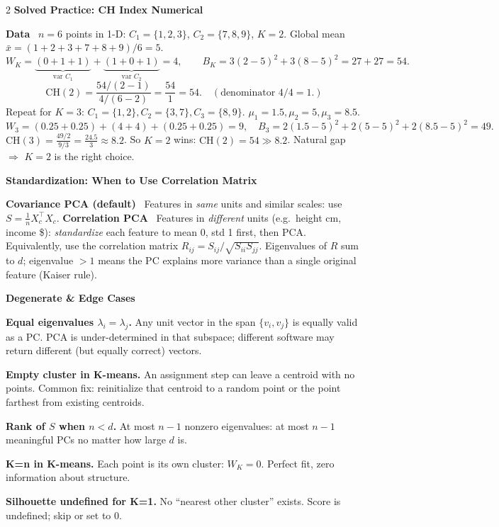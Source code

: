 \documentclass[10pt,fleqn]{article}
\newcommand{\shead}[1]{\vspace{0.1ex}\textbf{\scriptsize #1}\par}
\newcommand{\topic}[1]{\textbf{#1}\ }
\newcommand{\qa}[2]{\textbf{#1} #2\par}
\begin{document}
\begin{multicols*}{2}
\shead{Solved Practice: CH Index Numerical}
\topic{Data} \(n=6\) points in 1-D: \(C_1=\{1,2,3\}\), \(C_2=\{7,8,9\}\), \(K=2\). Global mean \(\bar x=(1+2+3+7+8+9)/6=5\).
\[
W_K=\underbrace{(0+1+1)}_{\text{var }C_1}+\underbrace{(1+0+1)}_{\text{var }C_2}=4,\qquad
B_K=3(2-5)^2+3(8-5)^2=27+27=54.
\]
\[
\mathrm{CH}(2)=\frac{54/(2-1)}{4/(6-2)}=\frac{54}{1}=54.\quad (\text{denominator }4/4=1.)
\]
Repeat for \(K=3\): \(C_1=\{1,2\},C_2=\{3,7\},C_3=\{8,9\}\). \(\mu_1=1.5,\mu_2=5,\mu_3=8.5\).
\[
W_3=(0.25+0.25)+(4+4)+(0.25+0.25)=9,\quad B_3=2(1.5-5)^2+2(5-5)^2+2(8.5-5)^2=49.
\]
\(\mathrm{CH}(3)=\frac{49/2}{9/3}=\frac{24.5}{3}\approx 8.2\). So \(K=2\) wins: \(\boxed{\mathrm{CH}(2)=54\gg 8.2}\). Natural gap \(\Rightarrow\) \(K=2\) is the right choice.

\shead{Standardization: When to Use Correlation Matrix}
\topic{Covariance PCA (default)} Features in \emph{same} units and similar scales: use \(S=\frac1n X_c^\top X_c\).
\topic{Correlation PCA} Features in \emph{different} units (e.g.\ height cm, income \$): \emph{standardize} each feature to mean 0, std 1 first, then PCA. Equivalently, use the correlation matrix \(R_{ij}=S_{ij}/\sqrt{S_{ii}S_{jj}}\). Eigenvalues of \(R\) sum to \(d\); eigenvalue \(>1\) means the PC explains more variance than a single original feature (Kaiser rule).

\shead{Degenerate \& Edge Cases}
\qa{Equal eigenvalues \(\lambda_i=\lambda_j\).}{Any unit vector in the span \(\{v_i,v_j\}\) is equally valid as a PC. PCA is under-determined in that subspace; different software may return different (but equally correct) vectors.}
\qa{Empty cluster in K-means.}{An assignment step can leave a centroid with no points. Common fix: reinitialize that centroid to a random point or the point farthest from existing centroids.}
\qa{Rank of \(S\) when \(n<d\).}{At most \(n-1\) nonzero eigenvalues: at most \(n-1\) meaningful PCs no matter how large \(d\) is.}
\qa{K=n in K-means.}{Each point is its own cluster: \(W_K=0\). Perfect fit, zero information about structure.}
\qa{Silhouette undefined for K=1.}{No ``nearest other cluster'' exists. Score is undefined; skip or set to 0.}


\end{multicols*}
\end{document}
